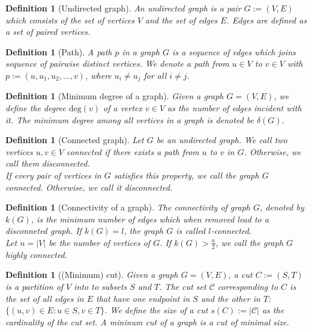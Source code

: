 \documentclass[paper=a4,fontsize=11pt,DIV=8,BCOR=5mm,twoside,pdftex,bibtotocnumbered]{scrreprt}
\newcommand{\degree}{\text{deg}}
\theoremstyle{plain}
\newtheorem{definition}[proposition]{Definition}
\begin{document}
\begin{definition}[Undirected graph]
	An \emph{undirected graph} is a pair $G := (V, E)$ which consists of the set of vertices $V$ and the set of edges $E$. Edges are defined as a set of paired vertices.
\end{definition}

\begin{definition}[Path]
	A \emph{path} $p$ in a graph $G$ is a sequence of edges which joins sequence of pairwise distinct vertices. We denote a path from $u\in V$ to $v\in V$ with $p := (u, u_1, u_2, \dots, v)$, where $u_i \neq u_j$ for all $i\neq j$.
\end{definition}

\begin{definition}[Minimum degree of a graph]
	Given a graph $G=(V,E)$, we define the \emph{degree} $\degree(v)$ of a vertex $v\in V$ as the number of edges incident with it. The \emph{minimum degree} among all vertices in a graph is denoted be $\delta(G)$.
\end{definition}

\begin{definition}[Connected graph]
	Let $G$ be an undirected graph. We call two vertices $u,v \in V$ connected if there exists a path from $u$ to $v$ in $G$. Otherwise, we call them disconnected. \\
	If every pair of vertices in $G$ satisfies this property, we call the graph $G$ \emph{connected}. Otherwise, we call it disconnected.
\end{definition}

\begin{definition}[Connectivity of a graph]
	The \emph{connectivity} of graph $G$, denoted by $k(G)$, is the minimum number of edges which when removed lead to a disconneted graph. If $k(G) = l$, the graph $G$ is called \emph{$l$-connected}. \\
	Let $n = |V|$ be the number of vertices of $G$. If $k(G) > \frac{n}{2}$, we call the graph $G$ \emph{highly connected}.
\end{definition}

\begin{definition}[(Minimum) cut]
	Given a graph $G = (V, E)$, a \emph{cut} $C := (S, T)$ is a partition of $V$ into to subsets $S$ and $T$. The \emph{cut set} $\mathcal{C}$ corresponding to $C$ is the set of all edges in $E$ that have one endpoint in $S$ and the other in $T$: $\{(u,v) \in E : u \in S, v \in T\}$. We define the \emph{size} of a cut $s(C) := |\mathcal{C}|$ as the cardinality of the cut set. A \emph{mininum cut} of a graph is a cut of minimal size.
\end{definition}
\end{document}
